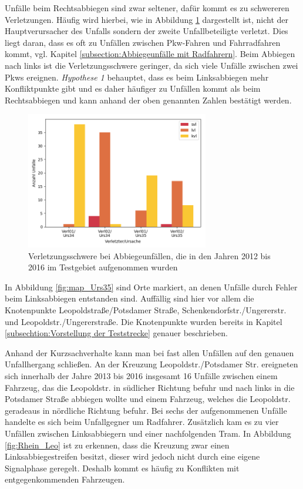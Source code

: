 Unfälle beim Rechtsabbiegen sind zwar seltener, dafür kommt es zu schwereren Verletzungen. Häufig wird hierbei, wie in Abbildung \ref{fig:Abbiegen_Verletzungen} dargestellt ist, nicht der Hauptverursacher des Unfalls sondern der zweite Unfallbeteiligte verletzt. Dies liegt daran, dass es oft zu Unfällen zwischen Pkw-Fahren und Fahrradfahren kommt, vgl. Kapitel \ref{subsection:Abbiegeunfälle mit Radfahrern}. Beim Abbiegen nach links ist die Verletzungsschwere geringer, da sich viele Unfälle zwischen zwei Pkws ereignen. \textit{Hypothese 1} behauptet, dass es beim Linksabbiegen mehr Konfliktpunkte gibt und es daher häufiger zu Unfällen kommt als beim Rechtsabbiegen und kann anhand der oben genannten Zahlen bestätigt werden.

\begin{savenotes}
	\begin{figure}[H]
		\centering
		\includegraphics[width=8cm,height=6cm]{figures/Abbiegen_Verletzung}
		\caption[Verletzungsschwere der Unfallbeteiligten bei Abbiegeunfällen, die in den Jahren 2012 bis 2016 im Testgebiet aufgenommen wurden]{Verletzungsschwere bei Abbiegeunfällen, die in den Jahren 2012 bis 2016 im Testgebiet aufgenommen wurden}\label{fig:Abbiegen_Verletzungen}
	\end{figure}
\end{savenotes}

In Abbildung \ref{fig:map_Urs35} sind Orte markiert, an denen Unfälle durch Fehler beim Linksabbiegen entstanden sind. Auffällig sind hier vor allem die Knotenpunkte Leopoldstraße/Potsdamer Straße, Schenkendorfstr./Ungererstr. und Leopoldstr./Ungererstraße. Die Knotenpunkte wurden bereits in Kapitel \ref{subsechtion:Vorstellung der Teststrecke} genauer beschrieben.

Anhand der Kurzsachverhalte kann man bei fast allen Unfällen auf den genauen Unfallhergang schließen. An der Kreuzung Leopoldstr./Potsdamer Str. ereigneten sich innerhalb der Jahre 2013 bis 2016 insgesamt 16 Unfälle zwischen einem Fahrzeug, das die Leopoldstr. in südlicher Richtung befuhr und nach links in die Potsdamer Straße abbiegen wollte und einem Fahrzeug, welches die Leopoldstr. geradeaus in nördliche Richtung befuhr. Bei sechs der aufgenommenen Unfälle handelte es sich beim Unfallgegner um Radfahrer. Zusätzlich kam es zu vier Unfällen zwischen Linksabbiegern und einer nachfolgenden Tram. In Abbildung \ref{fig:Rhein_Leo} ist zu erkennen, dass die Kreuzung zwar einen Linksabbiegestreifen besitzt, dieser wird jedoch nicht durch eine eigene Signalphase geregelt. Deshalb kommt es häufig zu Konflikten mit entgegenkommenden Fahrzeugen.

